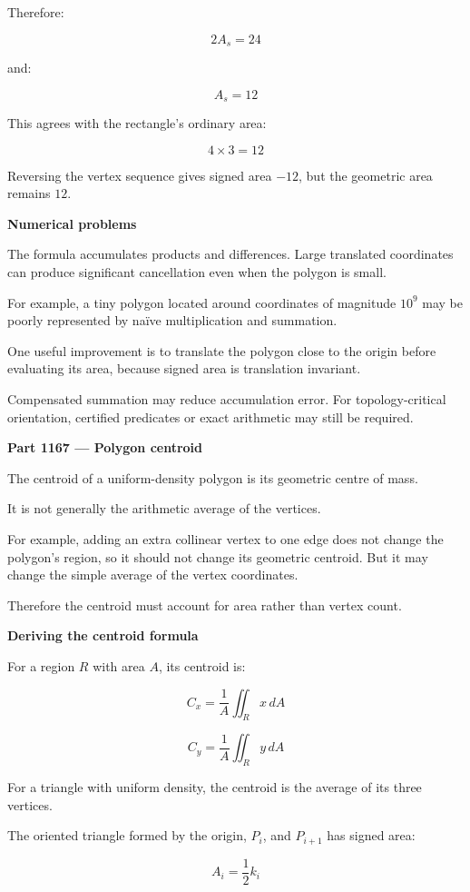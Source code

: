 Therefore:

\[
2A_s=24
\]

and:

\[
\boxed{A_s=12}
\]

This agrees with the rectangle's ordinary area:

\[
4\times3=12
\]

Reversing the vertex sequence gives signed area \(-12\), but the geometric area remains \(12\).

\textbf{Numerical problems}

The formula accumulates products and differences. Large translated coordinates can produce significant cancellation even when the polygon is small.

For example, a tiny polygon located around coordinates of magnitude \(10^9\) may be poorly represented by naïve multiplication and summation.

One useful improvement is to translate the polygon close to the origin before evaluating its area, because signed area is translation invariant.

Compensated summation may reduce accumulation error. For topology-critical orientation, certified predicates or exact arithmetic may still be required.

\textbf{Part 1167 --- Polygon centroid}

The centroid of a uniform-density polygon is its geometric centre of mass.

It is not generally the arithmetic average of the vertices.

For example, adding an extra collinear vertex to one edge does not change the polygon's region, so it should not change its geometric centroid. But it may change the simple average of the vertex coordinates.

Therefore the centroid must account for area rather than vertex count.

\textbf{Deriving the centroid formula}

For a region \(R\) with area \(A\), its centroid is:

\[
C_x=\frac1A\iint_R x\,dA
\]

\[
C_y=\frac1A\iint_R y\,dA
\]

For a triangle with uniform density, the centroid is the average of its three vertices.

The oriented triangle formed by the origin, \(P_i\), and \(P_{i+1}\) has signed area:

\[
A_i=\frac12k_i
\]

